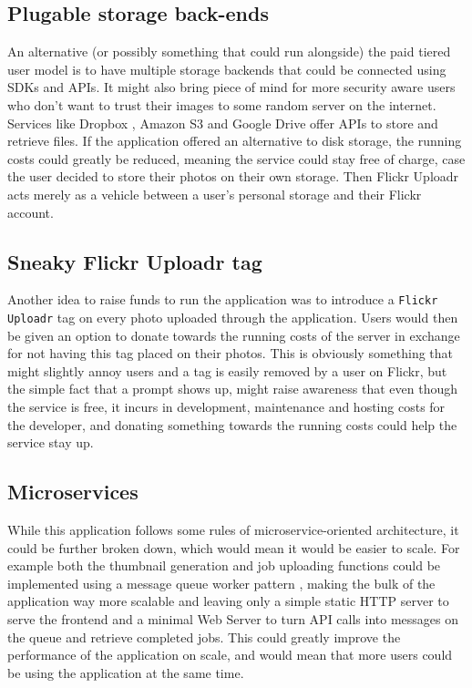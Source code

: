 \documentclass[10pt, a4paper]{article}
\begin{document}
        \subsection{Plugable storage back-ends}
        An alternative (or possibly something that could run alongside) the paid tiered user model is to have multiple storage backends that could be connected using SDKs and APIs. It might also bring piece of mind for more security aware users who don't want to trust their images to some random server on the internet.
        Services like Dropbox \cite{dropbox}, Amazon S3 \cite{s3} and Google Drive \cite{gdrive} offer APIs to store and retrieve files. If the application offered an alternative to disk storage, the running costs could greatly be reduced, meaning the service could stay free of charge, case the user decided to store their photos on their own storage. Then Flickr Uploadr acts merely as a vehicle between a user's personal storage and their Flickr account. 

        \subsection{Sneaky Flickr Uploadr tag}
        Another idea to raise funds to run the application was to introduce a \texttt{Flickr Uploadr} tag on every photo uploaded through the application. Users would then be given an option to donate towards the running costs of the server in exchange for not having this tag placed on their photos. This is obviously something that might slightly annoy users and a tag is easily removed by a user on Flickr, but the simple fact that a prompt shows up, might raise awareness that even though the service is free, it incurs in development, maintenance and hosting costs for the developer, and donating something towards the running costs could help the service stay up.
        
        \subsection{Microservices}
        While this application follows some rules of microservice-oriented architecture, it could be further broken down, which would mean it would be easier to scale. For example both the thumbnail generation and job uploading functions could be implemented using a message queue worker pattern \cite{message_queue_pattern}, making the bulk of the application way more scalable and leaving only a simple static HTTP server to serve the frontend and a minimal Web Server to turn API calls into messages on the queue and retrieve completed jobs. This could greatly improve the performance of the application on scale, and would mean that more users could be using the application at the same time.
\end{document}

